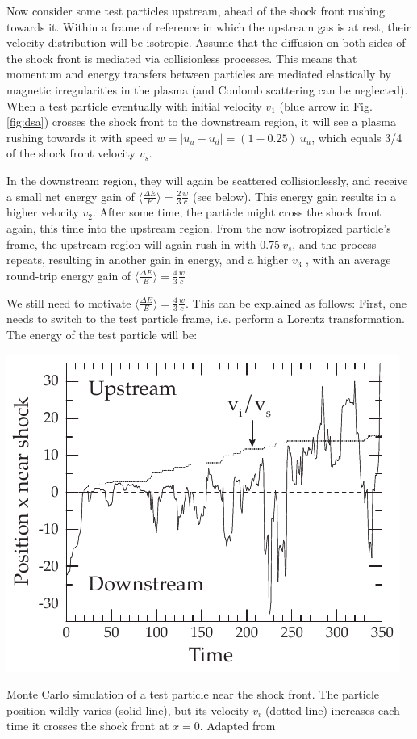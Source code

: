 \documentclass[
    a4paper, %
    fontsize=10pt, %
    twoside=false, %
    numbers=noenddot, %
    fontmethod=tex,
]{kaobook}
\begin{document}
Now consider some test particles upstream, ahead of the shock front rushing towards it. Within a frame of reference in which the upstream gas is at rest, their velocity distribution will be isotropic. Assume that the diffusion on both sides of the shock front is mediated via collisionless processes. This means that momentum and energy transfers between particles are mediated elastically by magnetic irregularities in the plasma (and Coulomb scattering can be neglected). When a test particle eventually with initial velocity $v_1$ (blue arrow in Fig. \ref{fig:dsa}) crosses the shock front to the downstream region, it will see a plasma rushing towards it with speed $w=|u_u-u_d| = (1-0.25)~u_u$, which equals 3/4 of the shock front velocity $v_s$. 

In the downstream region, they will again be scattered collisionlessly, and receive a small net energy gain of $\big\langle\frac{\Delta E}{E}\big\rangle = \frac{2}{3}\frac{w}{c}$ (see below). This energy gain results in a higher velocity $v_2$. After some time, the particle might cross the shock front again, this time into the upstream region. From the now isotropized particle's frame, the upstream region will again rush in with $0.75~v_s$, and the process repeats, resulting in another gain in energy, and a higher $v_3$ , with an average round-trip energy gain of $\big\langle\frac{\Delta E}{E}\big\rangle = \frac{4}{3}\frac{w}{c}$

We still need to motivate $\big\langle\frac{\Delta E}{E}\big\rangle = \frac{4}{3}\frac{w}{c}$. This can be explained as follows: First, one needs to switch to the test particle frame, i.e. perform a Lorentz transformation. The energy of the test particle will be:

\begin{marginfigure}
    \includegraphics{theory/dsa_mc.pdf}
    \caption[DSA Monte Carlo]{Monte Carlo simulation of a test particle near the shock front. The particle position wildly varies (solid line), but its velocity $v_i$ (dotted line) increases each time it crosses the shock front at $x=0$. Adapted from \cite{Baring1997}}
\end{marginfigure}
\end{document}
